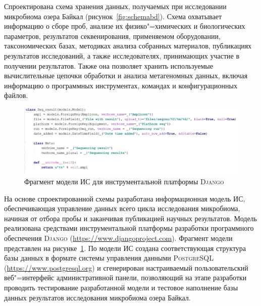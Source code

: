 \documentclass[a4paper,12pt,openany,final]{extreport}
\def\oldcaption{} \let\oldcaption=\caption
\def\caption{\stepcounter{captionsnum}\oldcaption}
\begin{document}
Спроектирована схема хранения данных, получаемых при исследовании микробиома озера Байкал (рисунок~\ref{fig:schemabd}). Схема охватывает информацию о сборе проб, анализе их физико"=химических и биологических параметров, результатов секвенирования, применяемом оборудовании, таксономических базах, методиках анализа собранных материалов, публикациях результатов исследований, а также исследователях, принимающих участие в получении результатов. Также она позволяет хранить используемые вычислительные цепочки обработки и анализа метагеномных данных, включая информацию о программных инструментах, командах и конфигурационных файлов.

\begin{figure}\centering
\includegraphics[width=0.9\linewidth]{media/image16.png}

\caption{Фрагмент модели ИС для инструментальной платформы \textsc{Django}}\label{fig:instrmod}

\end{figure}

На основе спроектированной схемы разработана информационная модель ИС, обеспечивающая управление данных всего цикла исследования микробиома, начиная от отбора пробы и заканчивая публикацией научных результатов.  Модель реализована средствами инструментальной платформы разработки программного обеспечения \textsc{Django} (\href{https://www.djangoproject.com}{{https://www.djangoproject.com}}).  Фрагмент модели представлен на рисунке~\ref{fig:instrmod}. По модели ИС создана соответствующая структура базы данных в формате системы управления данными \textsc{PostgreSQL} (\href{https://www.postgresql.org}{{https://www.postgresql.org}}) и сгенерирован настраиваемый пользовательский веб"=интерфейс административной панели, позволяющий на этапе разработки проводить тестирование разработанной модели и тестовое наполнение базы данных результатов исследования микробиома озера Байкал.
\end{document}
